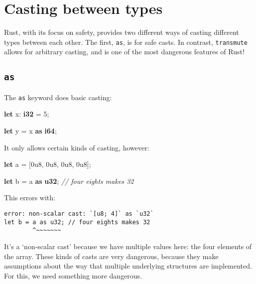 \documentclass[a4paper,]{book}
\newenvironment{Shaded}{\begin{snugshade}}{\end{snugshade}}
\newcommand{\KeywordTok}[1]{\textcolor[rgb]{0.13,0.29,0.53}{\textbf{{#1}}}}
\newcommand{\DecValTok}[1]{\textcolor[rgb]{0.00,0.00,0.81}{{#1}}}
\newcommand{\CommentTok}[1]{\textcolor[rgb]{0.56,0.35,0.01}{\textit{{#1}}}}
\newcommand{\NormalTok}[1]{{#1}}
\begin{document}
\section{Casting between types}\label{sec--casting-between-types}

Rust, with its focus on safety, provides two different ways of casting
different types between each other. The first, \texttt{as}, is for safe
casts. In contrast, \texttt{transmute} allows for arbitrary casting, and
is one of the most dangerous features of Rust!

\subsection{\texorpdfstring{\texttt{as}}{as}}\label{as}

The \texttt{as} keyword does basic casting:

\begin{Shaded}
\begin{Highlighting}[]
\KeywordTok{let} \NormalTok{x: }\KeywordTok{i32} \NormalTok{= }\DecValTok{5}\NormalTok{;}

\KeywordTok{let} \NormalTok{y = x }\KeywordTok{as} \KeywordTok{i64}\NormalTok{;}
\end{Highlighting}
\end{Shaded}

It only allows certain kinds of casting, however:

\begin{Shaded}
\begin{Highlighting}[]
\KeywordTok{let} \NormalTok{a = [}\DecValTok{0u8}\NormalTok{, }\DecValTok{0u8}\NormalTok{, }\DecValTok{0u8}\NormalTok{, }\DecValTok{0u8}\NormalTok{];}

\KeywordTok{let} \NormalTok{b = a }\KeywordTok{as} \KeywordTok{u32}\NormalTok{; }\CommentTok{// four eights makes 32}
\end{Highlighting}
\end{Shaded}

This errors with:

\begin{verbatim}
error: non-scalar cast: `[u8; 4]` as `u32`
let b = a as u32; // four eights makes 32
        ^~~~~~~~
\end{verbatim}

It's a `non-scalar cast' because we have multiple values here: the four
elements of the array. These kinds of casts are very dangerous, because
they make assumptions about the way that multiple underlying structures
are implemented. For this, we need something more dangerous.
\end{document}
